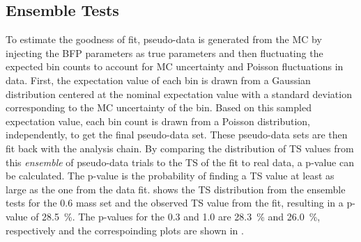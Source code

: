 


\subsection{Ensemble Tests} 

To estimate the goodness of fit, pseudo-data is generated from the MC by injecting the BFP parameters as true parameters and then fluctuating the expected bin counts to account for MC uncertainty and Poisson fluctuations in data. First, the expectation value of each bin is drawn from a Gaussian distribution centered at the nominal expectation value with a standard deviation corresponding to the MC uncertainty of the bin. Based on this sampled expectation value, each bin count is drawn from a Poisson distribution, independently, to get the final pseudo-data set. These pseudo-data sets are then fit back with the analysis chain. By comparing the distribution of TS values from this \textit{ensemble} of pseudo-data trials to the TS of the fit to real data, a p-value can be calculated. The p-value is the probability of finding a TS value at least as large as the one from the data fit.  shows the TS distribution from the ensemble tests for the \SI{0.6}{\gev} mass set and the observed TS value from the fit, resulting in a p-value of \SI{28.5}{\percent}. The p-values for the \SI{0.3}{\gev} and \SI{1.0}{\gev} are \SI{28.3}{\percent} and \SI{26.0}{\percent}, respectively and the correspoinding plots are shown in .

